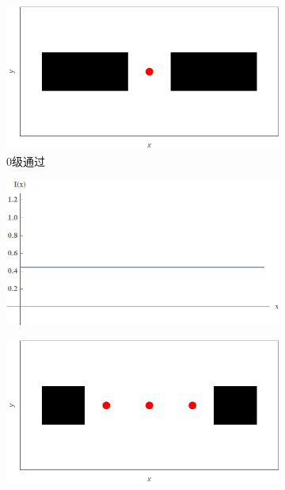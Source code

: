 \documentclass[a4paper]{article}
\begin{document}
\begin{figure}[H]
\begin{subfigure}[t]{0.4\textwidth}
    \end{subfigure}
    \begin{subfigure}[t]{0.4\textwidth}
        \centering
        \includegraphics[width=\textwidth]{simu/B.png}
        \caption{$0$级通过}
        \label{fig3-3-3}
    \end{subfigure}
    \begin{subfigure}[t]{0.4\textwidth}
        \centering
        \includegraphics[width=\textwidth]{simu/Bimg.png}
        \caption{}
        \label{fig3-3-4}
    \end{subfigure}
    \begin{subfigure}[t]{0.4\textwidth}
        \centering
        \includegraphics[width=\textwidth]{simu/C.png}

\end{subfigure}
\end{figure}
\end{document}
